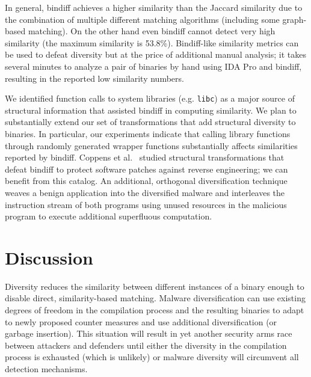 \documentclass[letterpaper,twocolumn,10pt]{article}
\begin{document}
In general, bindiff achieves a higher similarity than the Jaccard similarity due
to the combination of multiple different matching algorithms (including some
graph-based matching). On the other hand even bindiff cannot detect very high
similarity (the maximum similarity is 53.8\%). Bindiff-like similarity metrics
can be used to defeat diversity but at the price of additional manual analysis;
it takes several minutes to analyze a pair of binaries by hand using IDA Pro and
bindiff, resulting in the reported low similarity numbers.

We identified function calls to system libraries (e.g. {\tt libc}) as a major 
source of structural information that assisted bindiff in computing similarity.
We plan to substantially extend our set of transformations that add structural 
diversity to binaries. In particular, our experiments indicate that calling
library functions through randomly generated wrapper functions substantially
affects similarities reported by bindiff.  Coppens et al.~\cite{coppens13taco}
studied structural transformations that defeat bindiff to protect software
patches against reverse engineering; we can benefit from this catalog.  An
additional, orthogonal diversification technique weaves a benign application
into the diversified malware and interleaves the instruction stream of both
programs using unused resources in the malicious program to execute additional
superfluous computation.


\section{Discussion}

Diversity reduces the similarity between different instances of a binary enough
to disable direct, similarity-based matching. Malware diversification can use
existing degrees of freedom in the compilation process and the resulting
binaries to adapt to newly proposed counter measures and use additional
diversification (or garbage insertion). This situation will result in yet
another security arms race between attackers and defenders until either the
diversity in the compilation process is exhausted (which is unlikely) or malware
diversity will circumvent all detection mechanisms.


\end{document}
